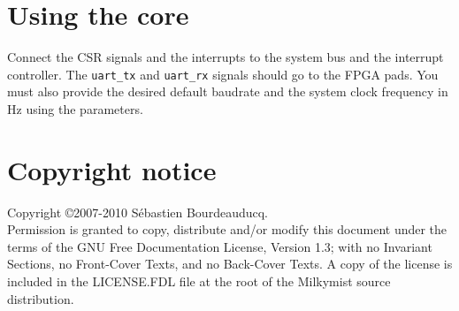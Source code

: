 \documentclass[a4paper,11pt]{article}
\begin{document}
\section{Using the core}
Connect the CSR signals and the interrupts to the system bus and the interrupt controller. The \verb!uart_tx! and \verb!uart_rx! signals should go to the FPGA pads. You must also provide the desired default baudrate and the system clock frequency in Hz using the parameters.

\section*{Copyright notice}
Copyright \copyright 2007-2010 S\'ebastien Bourdeauducq. \\
Permission is granted to copy, distribute and/or modify this document under the terms of the GNU Free Documentation License, Version 1.3; with no Invariant Sections, no Front-Cover Texts, and no Back-Cover Texts. A copy of the license is included in the LICENSE.FDL file at the root of the Milkymist source distribution.
\end{document}
